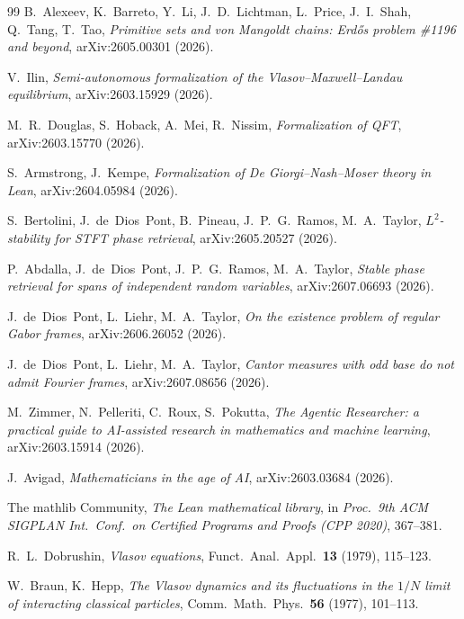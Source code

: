 \documentclass[11pt]{article}
\theoremstyle{plain}
\theoremstyle{definition}
\theoremstyle{remark}
\begin{document}
\begin{thebibliography}{99}
 B.~Alexeev, K.~Barreto, Y.~Li, J.~D.~Lichtman, L.~Price,
  J.~I.~Shah, Q.~Tang, T.~Tao, \emph{Primitive sets and von Mangoldt chains:
  Erd\H{o}s problem \#1196 and beyond}, arXiv:2605.00301 (2026).

 V.~Ilin,
  \emph{Semi-autonomous formalization of the Vlasov--Maxwell--Landau
  equilibrium}, arXiv:2603.15929 (2026).

 M.~R.~Douglas, S.~Hoback, A.~Mei, R.~Nissim,
  \emph{Formalization of QFT}, arXiv:2603.15770 (2026).

 S.~Armstrong, J.~Kempe,
  \emph{Formalization of De Giorgi--Nash--Moser theory in Lean},
  arXiv:2604.05984 (2026).

 S.~Bertolini, J.~de~Dios~Pont, B.~Pineau,
  J.~P.~G.~Ramos, M.~A.~Taylor, \emph{$L^2$-stability for STFT phase
  retrieval}, arXiv:2605.20527 (2026).

 P.~Abdalla, J.~de~Dios~Pont, J.~P.~G.~Ramos,
  M.~A.~Taylor, \emph{Stable phase retrieval for spans of independent random
  variables}, arXiv:2607.06693 (2026).

 J.~de~Dios~Pont, L.~Liehr, M.~A.~Taylor,
  \emph{On the existence problem of regular Gabor frames},
  arXiv:2606.26052 (2026).

 J.~de~Dios~Pont, L.~Liehr, M.~A.~Taylor,
  \emph{Cantor measures with odd base do not admit Fourier frames},
  arXiv:2607.08656 (2026).

 M.~Zimmer, N.~Pelleriti, C.~Roux, S.~Pokutta,
  \emph{The Agentic Researcher: a practical guide to AI-assisted research in
  mathematics and machine learning}, arXiv:2603.15914 (2026).

 J.~Avigad, \emph{Mathematicians in the age of AI},
  arXiv:2603.03684 (2026).

 The mathlib Community, \emph{The Lean mathematical library},
  in \emph{Proc.\ 9th ACM SIGPLAN Int.\ Conf.\ on Certified Programs and Proofs
  (CPP 2020)}, 367--381.

 R.~L.~Dobrushin, \emph{Vlasov equations},
  Funct.\ Anal.\ Appl.\ \textbf{13} (1979), 115--123.

 W.~Braun, K.~Hepp, \emph{The Vlasov dynamics and its
  fluctuations in the $1/N$ limit of interacting classical particles},
  Comm.\ Math.\ Phys.\ \textbf{56} (1977), 101--113.


\end{thebibliography}
\end{document}

